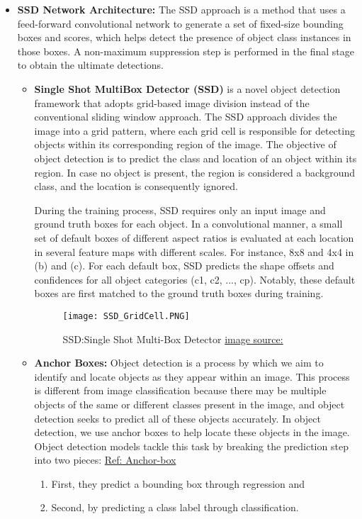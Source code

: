 \begin{itemize}
    \item \textbf{SSD Network Architecture: } The SSD approach is a method that uses a feed-forward convolutional network to generate a set of fixed-size bounding boxes and scores, which helps detect the presence of object class instances in those boxes. A non-maximum suppression step is performed in the final stage to obtain the ultimate detections. \\
    \begin{itemize}
        \item \textbf{Single Shot MultiBox Detector (SSD)} is a novel object detection framework that adopts grid-based image division instead of the conventional sliding window approach. The SSD approach divides the image into a grid pattern, where each grid cell is responsible for detecting objects within its corresponding region of the image. The objective of object detection is to predict the class and location of an object within its region. In case no object is present, the region is considered a background class, and the location is consequently ignored.

        During the training process, SSD requires only an input image and ground truth boxes for each object. In a convolutional manner, a small set of default boxes of different aspect ratios is evaluated at each location in several feature maps with different scales. For instance, 8x8 and 4x4 in (b) and (c). For each default box, SSD predicts the shape offsets and confidences for all object categories (c1, c2, ..., cp). Notably, these default boxes are first matched to the ground truth boxes during training.
        \begin{figure}[H]
            \centering
            \texttt{[image: SSD\_GridCell.PNG]}
            \caption{SSD:Single Shot Multi-Box Detector \textcolor{red}{\protect\href{https://arxiv.org/pdf/1512.02325.pdf}{image source: \cite{liu2016ssd}}}}
            \label{fig:SSD_grid}
        \end{figure}
        
        \item \textbf{Anchor Boxes:} Object detection is a process by which we aim to identify and locate objects as they appear within an image. This process is different from image classification because there may be multiple objects of the same or different classes present in the image, and object detection seeks to predict all of these objects accurately. In object detection, we use anchor boxes to help locate these objects in the image.
        Object detection models tackle this task by breaking the prediction step into two pieces: 
        \textcolor{red}{\href{https://blog.roboflow.com/what-is-an-anchor-box/}{Ref: Anchor-box}}
        \begin{enumerate}
            \item First, they predict a bounding box through regression and
            \item Second, by predicting a class label through classification.
        \end{enumerate}
        

\end{itemize}
\end{itemize}
